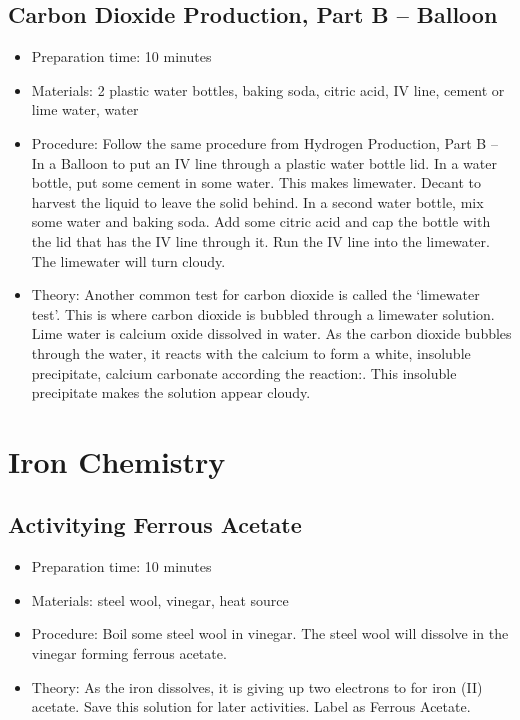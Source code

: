\subsection{Carbon Dioxide Production, Part B -- \texorpdfstring{}{CO2} Balloon}
\begin{itemize}
\item{Preparation time: 10 minutes}
\item{Materials: 2 plastic water bottles, baking soda, citric acid, IV line, cement or lime water, water}
\item{Procedure: Follow the same procedure from Hydrogen Production, Part B -- In a Balloon to put an IV line through a plastic water bottle lid. In a water bottle, put some cement in some water. This makes limewater. Decant to harvest the liquid to leave the solid behind. In a second water bottle, mix some water and baking soda. Add some citric acid and cap the bottle with the lid that has the IV line through it. Run the IV line into the limewater. The limewater will turn cloudy.}
\item{Theory: Another common test for carbon dioxide is called the `limewater test'. This is where carbon dioxide is bubbled through a limewater solution. Lime water is calcium oxide dissolved in water. As the carbon dioxide bubbles through the water, it reacts with the calcium to form a white, insoluble precipitate, calcium carbonate according the reaction:. This insoluble precipitate makes the solution appear cloudy. }
\end{itemize}

\section{Iron Chemistry}

\subsection{Activitying Ferrous Acetate}
\begin{itemize}
\item{Preparation time: 10 minutes}
\item{Materials: steel wool, vinegar, heat source}
\item{Procedure: Boil some steel wool in vinegar. The steel wool will dissolve in the vinegar forming ferrous acetate.}
\item{Theory: As the iron dissolves, it is giving up two electrons to for iron (II) acetate. Save this solution for later activities. Label as Ferrous Acetate.}
\end{itemize}

